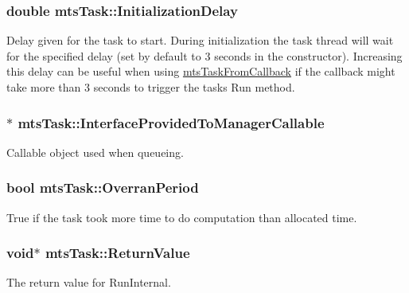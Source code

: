 \subsubsection[{Initialization\+Delay}]{\setlength{\rightskip}{0pt plus 5cm}double mts\+Task\+::\+Initialization\+Delay\hspace{0.3cm}{\ttfamily [protected]}}\label{classmts_task_a019723804fb78a9c8a2146d921290570}
Delay given for the task to start. During initialization the task thread will wait for the specified delay (set by default to 3 seconds in the constructor). Increasing this delay can be useful when using \hyperlink{classmts_task_from_callback}{mts\+Task\+From\+Callback} if the callback might take more than 3 seconds to trigger the task\textquotesingle{}s Run method. \hypertarget{classmts_task_a044e5d67f206af2df17d7406860d4ec4}{}
\subsubsection[{Interface\+Provided\+To\+Manager\+Callable}]{$\ast$ mts\+Task\+::\+Interface\+Provided\+To\+Manager\+Callable\hspace{0.3cm}{\ttfamily [protected]}}\label{classmts_task_a044e5d67f206af2df17d7406860d4ec4}
Callable object used when queueing. \hypertarget{classmts_task_a974896a778a02b8928397213658b1c83}{}
\subsubsection[{Overran\+Period}]{\setlength{\rightskip}{0pt plus 5cm}bool mts\+Task\+::\+Overran\+Period\hspace{0.3cm}{\ttfamily [protected]}}\label{classmts_task_a974896a778a02b8928397213658b1c83}
True if the task took more time to do computation than allocated time. \hypertarget{classmts_task_a78bef07d3d9f446ee5d83724ada03d7e}{}
\subsubsection[{Return\+Value}]{\setlength{\rightskip}{0pt plus 5cm}void$\ast$ mts\+Task\+::\+Return\+Value\hspace{0.3cm}{\ttfamily [protected]}}\label{classmts_task_a78bef07d3d9f446ee5d83724ada03d7e}
The return value for Run\+Internal. \hypertarget{classmts_task_a274a28efd0acb799f30a25ca6a729956}{}
